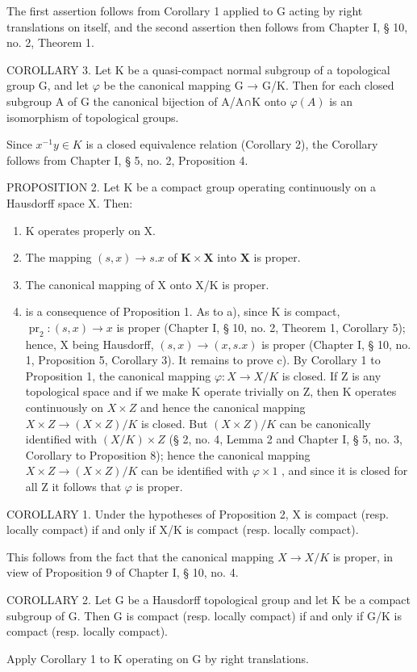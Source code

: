 The first assertion follows from Corollary 1 applied to G acting by right translations on itself, and the second assertion then follows from Chapter I, § 10, no. 2, Theorem 1.

COROLLARY 3. Let K be a quasi-compact normal subgroup of a topological group G, and let \(\varphi\) be the canonical mapping G → G/K. Then for each closed subgroup A of G the canonical bijection of A/A∩K onto \(\varphi(A)\) is an isomorphism of topological groups.

Since \(x^{-1}y \in K\) is a closed equivalence relation (Corollary 2), the Corollary follows from Chapter I, § 5, no. 2, Proposition 4.

PROPOSITION 2. Let K be a compact group operating continuously on a Hausdorff space X. Then:

\begin{enumerate}
\def\labelenumi{\alph{enumi})}
\item
  K operates properly on X.
\item
  The mapping \((s, x) \to s.x\) of \(\mathbf{K} \times \mathbf{X}\) into \(\mathbf{X}\) is proper.
\item
  The canonical mapping of X onto X/K is proper.
\item
  is a consequence of Proposition 1. As to a), since K is compact, \(\operatorname{pr}_{2}:(s,x)\to x\) is proper (Chapter I, § 10, no. 2, Theorem 1, Corollary 5); hence, X being Hausdorff, \((s,x)\to(x,s.x)\) is proper (Chapter I, § 10, no. 1, Proposition 5, Corollary 3). It remains to prove c). By Corollary 1 to Proposition 1, the canonical mapping \(\varphi:X\to X/K\) is closed. If Z is any topological space and if we make K operate trivially on Z, then K operates continuously on \(X\times Z\) and hence the canonical mapping \(X\times Z\to(X\times Z)/K\) is closed. But \((X\times Z)/K\) can be canonically identified with \((X/K)\times Z\) (§ 2, no. 4, Lemma 2 and Chapter I, § 5, no. 3, Corollary to Proposition 8); hence the canonical mapping \(X\times Z\to(X\times Z)/K\) can be identified with \(\varphi\times1\) , and since it is closed for all Z it follows that \(\varphi\) is proper.
\end{enumerate}

COROLLARY 1. Under the hypotheses of Proposition 2, X is compact (resp. locally compact) if and only if X/K is compact (resp. locally compact).

This follows from the fact that the canonical mapping \(X \rightarrow X/K\) is proper, in view of Proposition 9 of Chapter I, § 10, no. 4.

COROLLARY 2. Let G be a Hausdorff topological group and let K be a compact subgroup of G. Then G is compact (resp. locally compact) if and only if G/K is compact (resp. locally compact).

Apply Corollary 1 to K operating on G by right translations.
